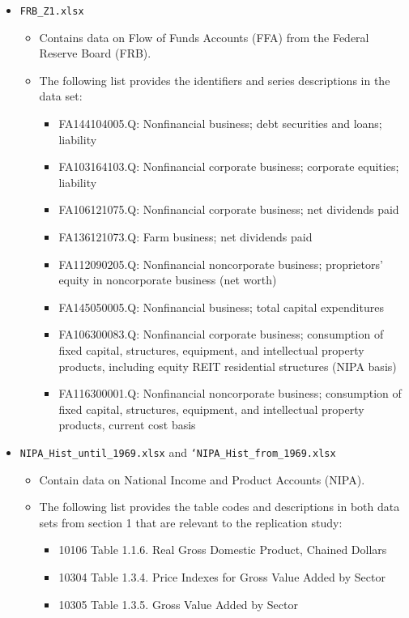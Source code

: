 \begin{itemize}
\item \texttt{FRB\_Z1.xlsx}
	\begin{itemize}
		\item Contains data on Flow of Funds Accounts (FFA) from the Federal Reserve Board (FRB).
		\item  The following list provides the identifiers and series descriptions in the data set:
			\begin{itemize}
				\item FA144104005.Q: Nonfinancial business; debt securities and loans; liability
				\item FA103164103.Q: Nonfinancial corporate business; corporate equities; liability
				\item FA106121075.Q: Nonfinancial corporate business; net dividends paid
				\item FA136121073.Q: Farm business; net dividends paid
				\item FA112090205.Q: Nonfinancial noncorporate business; proprietors' equity in noncorporate business (net worth)
				\item FA145050005.Q: Nonfinancial business; total capital expenditures
				\item FA106300083.Q: Nonfinancial corporate business; consumption of fixed capital, structures, equipment, and intellectual property products, including equity REIT residential structures (NIPA basis)
				\item FA116300001.Q: Nonfinancial noncorporate business; consumption of fixed capital, structures, equipment, and intellectual property products, current cost basis 
			\end{itemize}
	\end{itemize}

\item \texttt{NIPA\_Hist\_until\_1969.xlsx} and \texttt{`NIPA\_Hist\_from\_1969.xlsx}
	\begin{itemize}
		\item Contain data on National Income and Product Accounts (NIPA).
		\item The following list provides the table codes and descriptions in both data sets from section 1 that are relevant to the replication study:
		\begin{itemize}
			\item 10106	Table 1.1.6. Real Gross Domestic Product, Chained Dollars
			\item 10304	Table 1.3.4. Price Indexes for Gross Value Added by Sector
			\item 10305	Table 1.3.5. Gross Value Added by Sector
		\end{itemize}
	\end{itemize}


\end{itemize}
